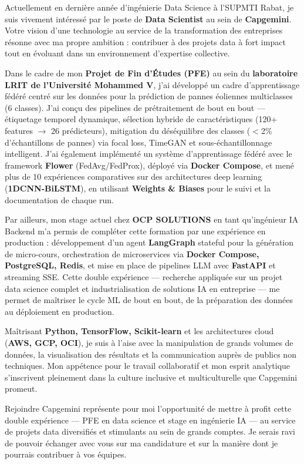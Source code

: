 \documentclass[11pt, a4paper]{awesome-cv}
\begin{document}
\makecvheader[R]
\makelettertitle

\begin{cvletter}

Actuellement en dernière année d'ingénierie Data Science à l'SUPMTI Rabat, je suis vivement intéressé par le poste de \textbf{Data Scientist} au sein de \textbf{Capgemini}. Votre vision d'une technologie au service de la transformation des entreprises résonne avec ma propre ambition : contribuer à des projets data à fort impact tout en évoluant dans un environnement d'expertise collective.

Dans le cadre de mon \textbf{Projet de Fin d'Études (PFE)} au sein du \textbf{laboratoire LRIT de l'Université Mohammed V}, j'ai développé un cadre d'apprentissage fédéré centré sur les données pour la prédiction de pannes éoliennes multiclasses (6 classes). J'ai conçu des pipelines de prétraitement de bout en bout — étiquetage temporel dynamique, sélection hybride de caractéristiques (120+ features $\rightarrow$ 26 prédicteurs), mitigation du déséquilibre des classes ($<$2\% d'échantillons de pannes) via focal loss, TimeGAN et sous-échantillonnage intelligent. J'ai également implémenté un système d'apprentissage fédéré avec le framework \textbf{Flower} (FedAvg/FedProx), déployé via \textbf{Docker Compose}, et mené plus de 10 expériences comparatives sur des architectures deep learning (\textbf{1DCNN-BiLSTM}), en utilisant \textbf{Weights \& Biases} pour le suivi et la documentation de chaque run.

Par ailleurs, mon stage actuel chez \textbf{OCP SOLUTIONS} en tant qu'ingénieur IA Backend m'a permis de compléter cette formation par une expérience en production : développement d'un agent \textbf{LangGraph} stateful pour la génération de micro-cours, orchestration de microservices via \textbf{Docker Compose, PostgreSQL, Redis}, et mise en place de pipelines LLM avec \textbf{FastAPI} et streaming SSE. Cette double expérience — recherche appliquée sur un projet data science complet et industrialisation de solutions IA en entreprise — me permet de maîtriser le cycle ML de bout en bout, de la préparation des données au déploiement en production.

Maîtrisant \textbf{Python, TensorFlow, Scikit-learn} et les architectures cloud (\textbf{AWS, GCP, OCI}), je suis à l'aise avec la manipulation de grands volumes de données, la visualisation des résultats et la communication auprès de publics non techniques. Mon appétence pour le travail collaboratif et mon esprit analytique s'inscrivent pleinement dans la culture inclusive et multiculturelle que Capgemini promeut.

Rejoindre Capgemini représente pour moi l'opportunité de mettre à profit cette double expérience — PFE en data science et stage en ingénierie IA — au service de projets data diversifiés et stimulants au sein de grands comptes. Je serais ravi de pouvoir échanger avec vous sur ma candidature et sur la manière dont je pourrais contribuer à vos équipes.

\end{cvletter}

\makeletterclosing
\end{document}
